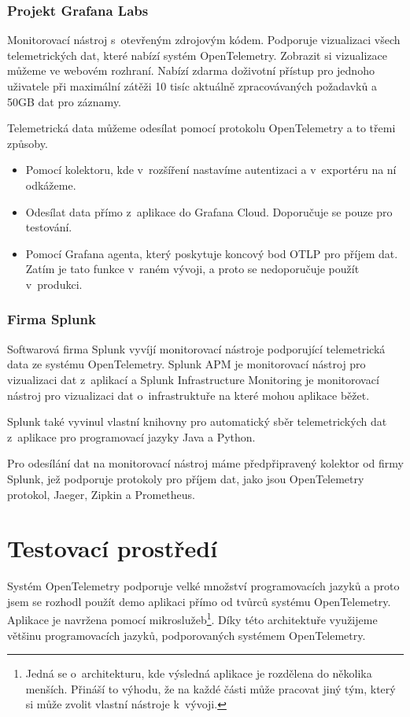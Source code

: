 \subsection{Projekt Grafana Labs}
Monitorovací nástroj s~otevřeným zdrojovým kódem. Podporuje vizualizaci všech telemetrických dat, které nabízí systém OpenTelemetry. Zobrazit si vizualizace můžeme ve webovém rozhraní. Nabízí zdarma doživotní přístup pro jednoho uživatele při maximální zátěži 10 tisíc aktuálně zpracovávaných požadavků a 50GB dat pro záznamy.

Telemetrická data můžeme odesílat pomocí protokolu OpenTelemetry a to třemi způsoby.
\begin{itemize}
    \item{Pomocí kolektoru, kde v~rozšíření nastavíme autentizaci a v~exportéru na ní odkážeme.}
    \item{Odesílat data přímo z~aplikace do Grafana Cloud. Doporučuje se pouze pro testování.}
    \item{Pomocí Grafana agenta, který poskytuje koncový bod OTLP pro příjem dat. Zatím je tato funkce v~raném vývoji, a proto se nedoporučuje použít v~produkci.}
\end{itemize}

\subsection{Firma Splunk}
Softwarová firma Splunk vyvíjí monitorovací nástroje podporující telemetrická data ze systému OpenTelemetry. Splunk APM je monitorovací nástroj pro vizualizaci dat z~aplikací a Splunk Infrastructure Monitoring je monitorovací nástroj pro vizualizaci dat o~infrastruktuře na které mohou aplikace běžet.

Splunk také vyvinul vlastní knihovny pro automatický sběr telemetrických dat z~aplikace pro programovací jazyky Java a Python.

Pro odesílání dat na monitorovací nástroj máme předpřipravený kolektor od firmy Splunk, jež podporuje protokoly pro příjem dat, jako jsou OpenTelemetry protokol, Jaeger, Zipkin a Prometheus.


\chapter{Testovací prostředí}

Systém OpenTelemetry podporuje velké množství programovacích jazyků a proto jsem se rozhodl použít demo aplikaci přímo od tvůrců systému OpenTelemetry. Aplikace je navržena pomocí mikroslužeb\footnote{Jedná se o~architekturu, kde výsledná aplikace je rozdělena do několika menších. Přináší to výhodu, že na každé části může pracovat jiný tým, který si může zvolit vlastní nástroje k~vývoji.}. Díky této architektuře využijeme většinu programovacích jazyků, podporovaných systémem OpenTelemetry.

